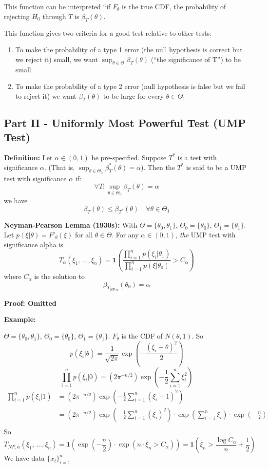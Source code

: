 \documentclass[12pt]{article}
\begin{document}
This function can be interpreted ``if $F_\theta$ is the true CDF, the probability of rejecting $H_0$ through $T$ is $\beta_T(\theta)$.

This function gives two criteria for a good test relative to other tests:
\begin{enumerate}
    \item To make the probability of a type 1 error (the null hypothesis is correct but we reject it) small, we want $\sup_{\theta \in \Theta} \beta_T(\theta)$ (``the significance of T'') to be small. 
    \item To make the probability of a type 2 error (null hypothesis is false but we fail to reject it) we want $\beta_T(\theta)$ to be large for every $\theta \in \Theta_1$
\end{enumerate}

\subsection*{Part II - Uniformly Most Powerful Test (UMP Test)}
\textbf{Definition:} Let $\alpha \in (0, 1)$ be pre-specified. Suppose $T^*$ is a test with significance $\alpha$. (That is, $\sup_{\theta \in \Theta_0} \beta_T^*(\theta) = \alpha$). Then the $T^*$ is said to be a UMP test with significance $\alpha$ if:
\[\forall T : \sup_{\theta \in \Theta_0} \beta_T(\theta) = \alpha\]
we have 
\[\beta_T(\theta) \leq \beta_{T^*}(\theta) \quad \forall \theta \in \Theta_1\]

\textbf{Neyman-Pearson Lemma (1930s):}
With $\Theta = \{\theta_0, \theta_1\}$, $\Theta_0 = \{\theta_0\}$, $\Theta_1 = \{\theta_1\}$. Let $p(\xi | \theta) = F'_\theta(\xi)$ for all $\theta \in \Theta$. For any $\alpha \in (0, 1)$, \emph{the} UMP test with significance alpha is 
\[T_\alpha (\xi_1, \, ..., \xi_n) = \mathbf{1}\left(\frac{\prod_{i=1}^n p(\xi_i|\theta_1)}{\prod_{i=1}^n p(\xi | \theta_0)} > C_\alpha\right)\]
where $C_\alpha$ is the solution to 
\[\beta_{T_{NP, \alpha}}(\theta_0) = \alpha\]

\textbf{Proof: Omitted}

\textbf{Example:}

$\Theta = \{\theta_0, \theta_1\}$, $\Theta_0 = \{\theta_0\}$, $\Theta_1 = \{\theta_1\}$. $F_\theta$ is the CDF of $N(\theta,1)$. So 
\[p(\xi_i | \theta) = \frac{1}{\sqrt{2\pi}}\exp(-\frac{(\xi_i - \theta)^2}{2})\]
\[\prod_{i=1}^n p(\xi_i|0) = (2\pi^{-n/2}) \exp(-\frac{1}{2}\sum_{i=1}^n \xi_i^2)\]
\begin{align*}
    \prod_{i=1}^n p(\xi_i|1) &= (2\pi^{-n/2}) \exp(-\frac{1}{2}\sum_{i=1}^n(\xi_i - 1)^2)\\
    &= (2\pi^{-n/2}) \exp(-\frac{1}{2}\sum_{i=1}^n(\xi_i)^2)\cdot \exp\left(\sum_{i=1}^n \xi_i\right) \cdot \exp(-\frac{n}{2})\\
\end{align*}
So 
\[T_{NP, \alpha}(\xi_1, \, ..., \xi_n) = \mathbf{1}\left(\exp(-\frac{n}{2}) \cdot \exp(n \cdot \bar{\xi}_n > C_\alpha)\right) = \mathbf{1}\left(\bar{\xi}_n > \frac{\log C_\alpha}{n} + \frac{1}{2}\right)\]
We have data $\{x_i\}_{i=1}^n$
\end{document}
